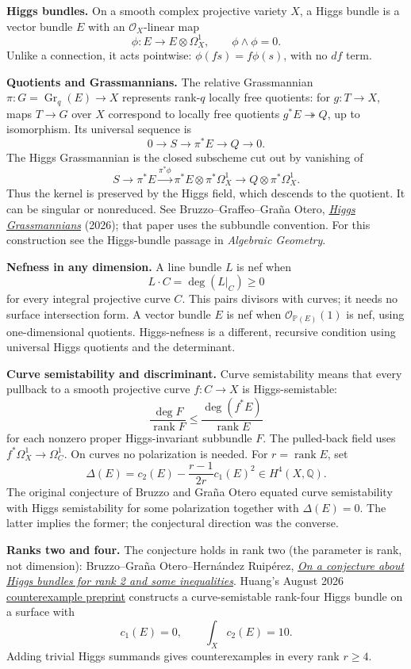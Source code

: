 \medskip\noindent
\textbf{Higgs bundles.}
On a smooth complex projective variety
$X$, a Higgs bundle is a vector bundle
$E$ with an $\mathcal{O}_X$-linear map
$$
\phi:E\longrightarrow E\otimes\Omega_X^1,
\qquad \phi\wedge\phi=0.
$$
Unlike a connection, it acts pointwise:
$\phi(fs)=f\phi(s)$, with no $df$ term.

\medskip\noindent
\textbf{Quotients and Grassmannians.}
The relative Grassmannian
$\pi:G=\operatorname{Gr}_q(E)\to X$
represents rank-$q$ locally free quotients:
for $g:T\to X$, maps $T\to G$ over $X$
correspond to locally free quotients
$g^*E\twoheadrightarrow Q$, up to
isomorphism. Its universal
sequence is
$$
0\longrightarrow S\longrightarrow\pi^*E
\longrightarrow Q\longrightarrow0.
$$
The Higgs Grassmannian is the closed
subscheme cut out by vanishing of
$$
S\longrightarrow\pi^*E
\xrightarrow{\pi^*\phi}
\pi^*E\otimes\pi^*\Omega_X^1
\longrightarrow Q\otimes\pi^*\Omega_X^1.
$$
Thus the kernel is preserved by the
Higgs field, which descends to the
quotient. It can be singular or nonreduced.
See Bruzzo--Graffeo--Graña Otero,
\href{https://arxiv.org/abs/2605.29147}%
{\emph{Higgs Grassmannians}} (2026);
that paper uses the subbundle convention.
For this construction
see the Higgs-bundle passage
in \emph{Algebraic Geometry}.

\medskip\noindent
\textbf{Nefness in any dimension.}
A line bundle $L$ is nef when
$$
L\cdot C=\deg(L|_C)\geq0
$$
for every integral projective curve $C$.
This pairs divisors with curves; it needs
no surface intersection form.
A vector bundle $E$ is nef when
$\mathcal{O}_{\mathbb{P}(E)}(1)$ is nef,
using one-dimensional quotients.
Higgs-nefness is a different, recursive
condition using universal Higgs quotients
and the determinant.

\medskip\noindent
\textbf{Curve semistability and
discriminant.}
Curve semistability means that every
pullback to a smooth projective curve
$f:C\to X$ is Higgs-semistable:
$$
\frac{\deg F}{\operatorname{rank}F}
\leq\frac{\deg(f^*E)}{\operatorname{rank}E}
$$
for each nonzero proper Higgs-invariant
subbundle $F$. The pulled-back field uses
$f^*\Omega_X^1\to\Omega_C^1$.
On curves no polarization is needed.
For $r=\operatorname{rank}E$, set
$$
\Delta(E)=c_2(E)-\frac{r-1}{2r}c_1(E)^2
\in H^4(X,\mathbb{Q}).
$$
The original conjecture of Bruzzo and
Graña Otero equated curve semistability
with Higgs semistability for some
polarization together with $\Delta(E)=0$.
The latter implies the former; the
conjectural direction was the converse.

\medskip\noindent
\textbf{Ranks two and four.}
The conjecture holds in rank two
(the parameter is rank, not dimension):
Bruzzo--Graña Otero--Hernández Ruipérez,
\href{https://arxiv.org/abs/2208.10554}%
{\emph{On a conjecture about Higgs bundles
for rank 2 and some inequalities}}.
Huang's August 2026
\href{https://arxiv.org/abs/2608.22448}%
{counterexample preprint}
constructs a curve-semistable rank-four
Higgs bundle on a surface with
$$
c_1(E)=0,\qquad\int_X c_2(E)=10.
$$
Adding trivial Higgs summands gives
counterexamples in every rank $r\geq4$.

